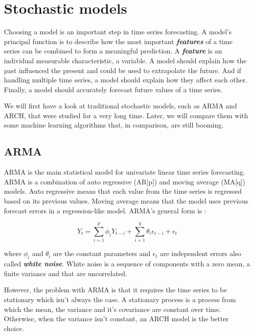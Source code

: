 \documentclass[11pt,a4paper,oneside]{book}
\begin{document}
\section{Stochastic models}

Choosing a model is an important step in time series forecasting. A model's principal function is to describe how the most important \textit{\textbf{features}} of a time series can be combined to form a meaningful prediction. A \textit{\textbf{feature}} is an individual measurable characteristic, a variable. A model should explain how the past influenced the present and could be used to extrapolate the future. And if handling multiple time series, a model should explain how they affect each other. Finally, a model should accurately forecast future values of a time series. \cite{hyndman}

We will first have a look at traditional stochastic models, such as ARMA and ARCH, that were studied for a very long time. Later, we will compare them with some machine learning algorithms that, in comparison, are still booming.


\subsection{ARMA}

ARMA is the main statistical model for univariate linear time series forecasting. ARMA is a combination of auto regressive (AR[p]) and moving average (MA[q]) models. Auto regressive means that each value from the time series is regressed based on its previous values. Moving average means that the model uses previous forecast errors in a regression-like model. ARMA's general form is : 

\begin{equation}
Y_{t} = \sum\limits_{i=1}^p \phi_{i} Y_{t-i} +  \sum\limits_{i=1}^q \theta_{i} \epsilon_{t-i} + \epsilon_{t} 
\end{equation}

where $\phi_{i}$ and $\theta_{i}$ are the constant parameters and $\epsilon_{t}$ are independent errors also called \textit{\textbf{white noise}}. White noise is a sequence of components with a zero mean, a finite variance and that are uncorrelated.

However, the problem with ARMA is that it requires the time series to be stationary which isn't always the case. A stationary process is a process from which the mean, the variance and it's covariance are constant over time. Otherwise, when the variance isn't constant, an ARCH model is the better choice. \cite{Holan}
\end{document}
